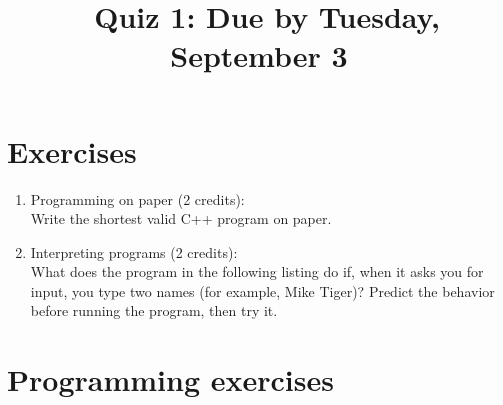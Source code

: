 \documentclass[11pt]{article}
\begin{document}
\title{\coursename~Quiz 1: Due by Tuesday, September 3}
\maketitle

\medskip


\section*{Exercises}

\begin{enumerate}
\item Programming on paper (2 credits): \\
Write the shortest valid C++ program on paper.

\item Interpreting programs (2 credits): \\
What does the program in the following listing do if, when it asks you for input, you type two names (for example, Mike Tiger)? Predict the behavior before running the program, then try it.



\end{enumerate}

\section*{Programming exercises}
\end{document}
